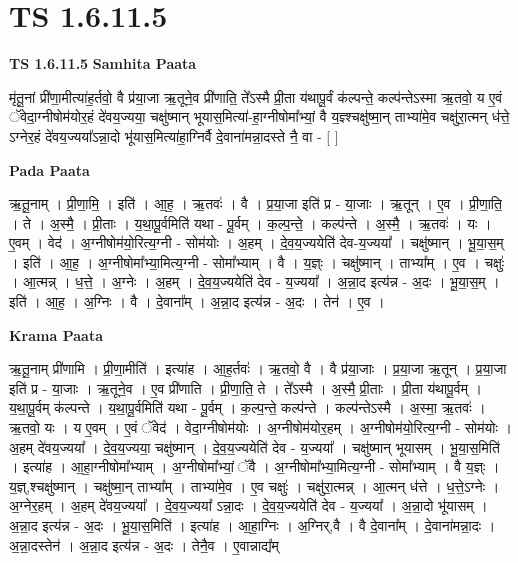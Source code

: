 \documentclass[17pt]{extarticle}
\begin{document}
\section{ TS 1.6.11.5 }

\textbf{TS 1.6.11.5 } \newline
\textbf{Samhita Paata} \newline

मृ॑तू॒नां प्री॑णा॒मीत्या॑ह॒र्तवो॒ वै प्र॑या॒जा ऋ॒तूने॒व प्री॑णाति॒ ते᳚ऽस्मै प्री॒ता य॑थापू॒र्वं क॑ल्पन्ते॒ कल्प॑न्तेऽस्मा ऋ॒तवो॒ य ए॒वं ॅवेदा॒ग्नीषोम॑योर॒हं दे॑वय॒ज्यया॒ चक्षु॑ष्मान् भूयास॒मित्या॑-हा॒ग्नीषोमा᳚भ्यां॒ वै य॒ज्ञ्श्चक्षु॑ष्मा॒न् ताभ्या॑मे॒व चक्षु॑रा॒त्मन् ध॑त्ते॒ ऽग्नेर॒हं दे॑वय॒ज्यया᳚ऽन्ना॒दो भू॑यास॒मित्या॑हा॒ग्निर्वै दे॒वाना॑मन्ना॒दस्ते नै॒ वा - [ ] \newline

\textbf{Pada Paata} \newline

ऋ॒तू॒नाम् । प्री॒णा॒मि॒ । इति॑ । आ॒ह॒ । ऋ॒तवः॑ । वै । प्र॒या॒जा इति॑ प्र - या॒जाः । ऋ॒तून् । ए॒व । प्री॒णा॒ति॒ । ते । अ॒स्मै॒ । प्री॒ताः । य॒था॒पू॒र्वमिति॑ यथा - पू॒र्वम् । क॒ल्प॒न्ते॒ । कल्प॑न्ते । अ॒स्मै॒ । ऋ॒तवः॑ । यः । ए॒वम् । वेद॑ । अ॒ग्नीषोम॑यो॒रित्य॒ग्नी - सोम॑योः । अ॒हम् । दे॒व॒य॒ज्ययेति॑ देव-य॒ज्यया᳚ । चक्षु॑ष्मान् । भू॒या॒स॒म् । इति॑ । आ॒ह॒ । अ॒ग्नीषोमा᳚भ्या॒मित्य॒ग्नी - सोमा᳚भ्याम् । वै । य॒ज्ञ्ः । चक्षु॑ष्मान् । ताभ्या᳚म् । ए॒व । चक्षुः॑ । आ॒त्मन्न् । ध॒त्ते॒ । अ॒ग्नेः । अ॒हम् । दे॒व॒य॒ज्ययेति॑ देव - य॒ज्यया᳚ । अ॒न्ना॒द इत्य॑न्न - अ॒दः । भू॒या॒स॒म् । इति॑ । आ॒ह॒ । अ॒ग्निः । वै । दे॒वाना᳚म् । अ॒न्ना॒द इत्य॑न्न - अ॒दः । तेन॑ । ए॒व ।  \newline


\textbf{Krama Paata} \newline

ऋ॒तू॒नाम् प्री॑णामि । प्री॒णा॒मीति॑ । इत्या॑ह । आ॒ह॒र्तवः॑ । ऋ॒तवो॒ वै । वै प्र॑या॒जाः । प्र॒या॒जा ऋ॒तून् । प्र॒या॒जा इति॑ प्र - या॒जाः । ऋ॒तूने॒व । ए॒व प्री॑णाति । प्री॒णा॒ति॒ ते । ते᳚ऽस्मै । अ॒स्मै॒ प्री॒ताः । प्री॒ता य॑थापू॒र्वम् । य॒था॒पू॒र्वम् क॑ल्पन्ते । य॒था॒पू॒र्वमिति॑ यथा - पू॒र्वम् । क॒ल्प॒न्ते॒ कल्प॑न्ते । कल्प॑न्तेऽस्मै । अ॒स्मा॒ ऋ॒तवः॑ । ऋ॒तवो॒ यः । य ए॒वम् । ए॒वं ॅवेद॑ । वेदा॒ग्नीषोम॑योः । अ॒ग्नीषोम॑योर॒हम् । अ॒ग्नीषोम॑यो॒रित्य॒ग्नी - सोम॑योः । अ॒हम् दे॑वय॒ज्यया᳚ । दे॒व॒य॒ज्यया॒ चक्षु॑ष्मान् । दे॒व॒य॒ज्ययेति॑ देव - य॒ज्यया᳚ । चक्षु॑ष्मान् भूयासम् । भू॒या॒स॒मिति॑ । इत्या॑ह । आ॒हा॒ग्नीषोमा᳚भ्याम् । अ॒ग्नीषोमा᳚भ्यां॒ ॅवै । अ॒ग्नीषोमा᳚भ्या॒मित्य॒ग्नी - सोमा᳚भ्याम् । वै य॒ज्ञ्ः । य॒ज्ञ्,श्चक्षु॑ष्मान् । चक्षु॑ष्मा॒न् ताभ्या᳚म् । ताभ्या॑मे॒व । ए॒व चक्षुः॑ । चक्षु॑रा॒त्मन्न् । आ॒त्मन् ध॑त्ते । ध॒त्ते॒ऽग्नेः । अ॒ग्नेर॒हम् । अ॒हम् दे॑वय॒ज्यया᳚ । दे॒व॒य॒ज्यया᳚ ऽन्ना॒दः । दे॒व॒य॒ज्ययेति॑ देव - य॒ज्यया᳚ । अ॒न्ना॒दो भू॑यासम् । अ॒न्ना॒द इत्य॑न्न - अ॒दः । भू॒या॒स॒मिति॑ । इत्या॑ह । आ॒हा॒ग्निः । अ॒ग्निर्,वै । वै दे॒वाना᳚म् । दे॒वाना॑मन्ना॒दः । अ॒न्ना॒दस्तेन॑ । अ॒न्ना॒द इत्य॑न्न - अ॒दः । तेनै॒व । ए॒वान्नाद्य᳚म् \newline
\end{document}
